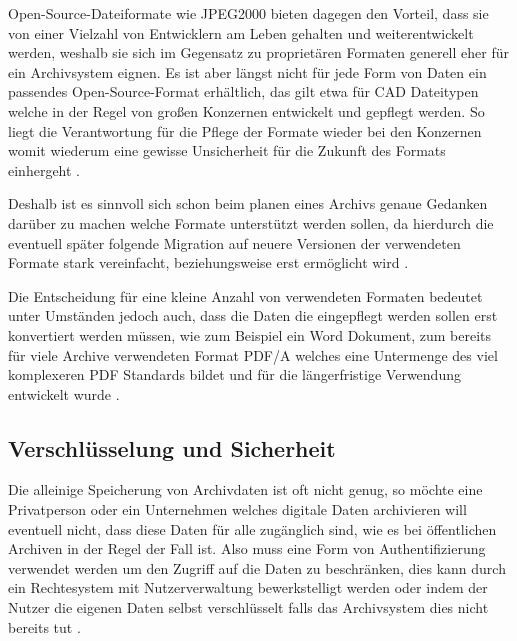 \documentclass[conference,compsoc,final,a4paper]{IEEEtran}
\begin{document}
Open-Source-Dateiformate wie JPEG2000 bieten dagegen den Vorteil, dass sie von einer Vielzahl von Entwicklern am Leben gehalten und weiterentwickelt werden, weshalb sie sich im Gegensatz zu proprietären Formaten generell eher für ein Archivsystem eignen. Es ist aber längst nicht für jede Form von Daten ein passendes Open-Source-Format erhältlich, das gilt etwa für \ac{CAD} Dateitypen welche in der Regel von großen Konzernen entwickelt und gepflegt werden. So liegt die Verantwortung für die Pflege der Formate wieder bei den Konzernen womit wiederum eine gewisse Unsicherheit für die Zukunft des Formats einhergeht \autocite{dpcFormatsStandards}. 

Deshalb ist es sinnvoll sich schon beim planen eines Archivs genaue Gedanken darüber zu machen welche Formate unterstützt werden sollen, da hierdurch die eventuell später folgende Migration auf neuere Versionen der verwendeten Formate stark vereinfacht, beziehungsweise erst ermöglicht wird \autocite{dpcFormatsStandards}.

Die Entscheidung für eine kleine Anzahl von verwendeten Formaten bedeutet unter Umständen jedoch auch, dass die Daten die eingepflegt werden sollen erst konvertiert werden müssen, wie zum Beispiel ein Word Dokument, zum bereits für viele Archive verwendeten Format \acs{PDF}/A welches eine Untermenge des viel komplexeren \acs{PDF} Standards bildet und für die längerfristige Verwendung entwickelt wurde \autocite{Strodl2007}.

\subsection{Verschlüsselung und Sicherheit}
Die alleinige Speicherung von Archivdaten ist oft nicht genug, so möchte eine Privatperson oder ein Unternehmen welches digitale Daten archivieren will eventuell nicht, dass diese Daten für alle zugänglich sind, wie es bei öffentlichen Archiven in der Regel der Fall ist. Also muss eine Form von Authentifizierung verwendet werden um den Zugriff auf die Daten zu beschränken, dies kann durch ein Rechtesystem mit Nutzerverwaltung bewerkstelligt werden oder indem der Nutzer die eigenen Daten selbst verschlüsselt falls das Archivsystem dies nicht bereits tut \autocite{Storer2006}.
\end{document}
